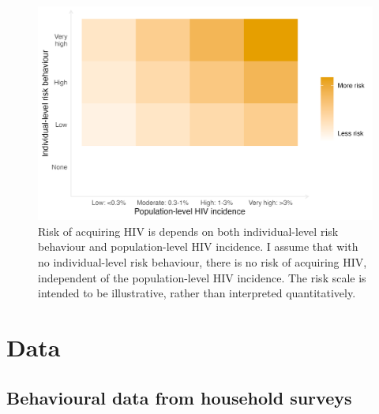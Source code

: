 \documentclass[a4paper, nobind]{templates/ociamthesis}
\begin{document}
\begin{figure}
\includegraphics[width=0.95\linewidth]{figures/multi-agyw/risk-grid} \caption{Risk of acquiring HIV is depends on both individual-level risk behaviour and population-level HIV incidence. I assume that with no individual-level risk behaviour, there is no risk of acquiring HIV, independent of the population-level HIV incidence. The risk scale is intended to be illustrative, rather than interpreted quantitatively.}\label{fig:risk-grid}
\end{figure}

\hypertarget{data-1}{%
\section{Data}\label{data-1}}

\hypertarget{behavioural-data-from-household-surveys}{%
\subsection{Behavioural data from household surveys}\label{behavioural-data-from-household-surveys}}
\end{document}

